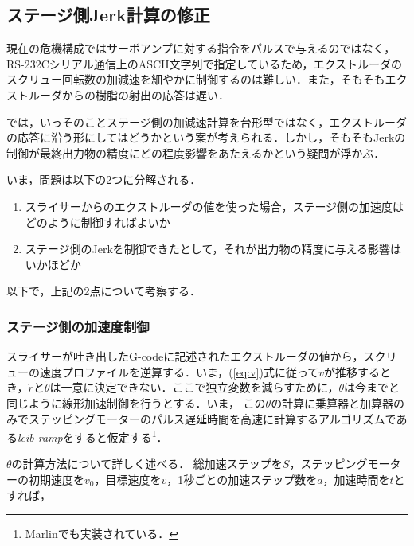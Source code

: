 \documentclass[twocolumn,oneside,a4paper]{article}
\begin{document}
\subsection{ステージ側Jerk計算の修正}
現在の危機構成ではサーボアンプに対する指令をパルスで与えるのではなく，RS-232Cシリアル通信上のASCII文字列で指定しているため，エクストルーダのスクリュー回転数の加減速を細やかに制御するのは難しい．また，そもそもエクストルーダからの樹脂の射出の応答は遅い．

では，いっそのことステージ側の加減速計算を台形型ではなく，エクストルーダの応答に沿う形にしてはどうかという案が考えられる．しかし，そもそもJerkの制御が最終出力物の精度にどの程度影響をあたえるかという疑問が浮かぶ．

いま，問題は以下の2つに分解される．

\begin{enumerate}
	\item スライサーからのエクストルーダの値を使った場合，ステージ側の加速度はどのように制御すればよいか
	\item ステージ側のJerkを制御できたとして，それが出力物の精度に与える影響はいかほどか	
\end{enumerate}

以下で，上記の2点について考察する．

\subsubsection{ステージ側の加速度制御}
スライサーが吐き出したG-codeに記述されたエクストルーダの値から，スクリューの速度プロファイルを逆算する．いま，(\ref{eq:v})式に従って$v$が推移するとき，$\dot{r}$と$\dot{\theta}$は一意に決定できない．ここで独立変数を減らすために，$\theta$は今までと同じように線形加速制御を行うとする．いま， この$\theta$の計算に乗算器と加算器のみでステッピングモーターのパルス遅延時間を高速に計算するアルゴリズムである{\it leib ramp}\cite{leib}をすると仮定する\footnote{Marlinでも実装されている．}．

$\theta$の計算方法について詳しく述べる．
総加速ステップを$S$，ステッピングモーターの初期速度を$v_0$，目標速度を$v$，1秒ごとの加速ステップ数を$a$，加速時間を$t$とすれば，
\end{document}
